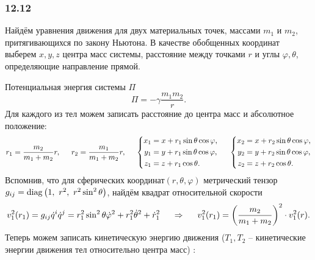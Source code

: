 \subsubsection*{12.12}

Найдём уравнения движения для двух материальных точек, массами $m_1$ и $m_2$, притягивающихся по закону Ньютона. В качестве обобщенных координат выберем $x, y, z$ центра масс системы, расстояние между точками $r$ и углы $\varphi, \theta$, определяющие направление прямой. 

Потенциальная энергия системы $\Pi$ 
\begin{equation*}
    \Pi = - \gamma \frac{m_1 m_2}{r}.
\end{equation*}
Для каждого из тел можем записать расстояние до центра масс и абсолютное положение:
\begin{equation*}
    r_1 = \frac{m_2}{m_1+m_2} r, \hspace{0.5cm} 
    r_2 = \frac{m_1}{m_1+m_2} r,
    \hspace{0.5cm} 
    \left\{\begin{aligned}
        x_1 &= x + r_1 \sin \theta \cos \varphi, \\
        y_1 &= y + r_1 \sin \theta \cos \varphi, \\
        z_1 &= z + r_1 \cos \theta.
    \end{aligned}\right.
    \hspace{0.5cm} 
    \left\{\begin{aligned}
        x_2 &= x + r_2 \sin \theta \cos \varphi, \\
        y_2 &= y + r_2 \sin \theta \cos \varphi, \\
        z_2 &= z + r_2 \cos \theta.
    \end{aligned}\right.
\end{equation*}
Вспомнив, что для сферических координат$(r,  \theta, \varphi)$ метрический тензор $g_{ij} = \mathop{\mathrm{diag}}\nolimits \left({1}, \ {r^2}, \ {r^2 \sin^2 \theta} \right)$, найдём  квадрат относительной скорости
\begin{equation*}
    v_1^2(r_1) = g_{ij} \dot{q}^i \dot{q}^j = 
    r_1^2 \sin^2 \theta \dot{\varphi}^2 + r_1^2 \dot{\theta}^2 + \dot{r}_1^2 
    \hspace{0.5cm} \Rightarrow \hspace{0.5cm} 
    v_1^2(r_1) = \left(
    \frac{m_2}{m_1+m_2} 
    \right)^2 \cdot v_1^2 (r).
\end{equation*}
Теперь можем записать кинетическую энергию движения ($T_1, T_2$ -- кинетические энергии движения тел относительно центра масс) :
